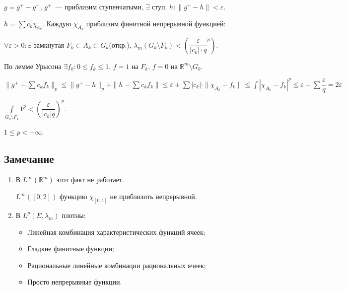 \documentclass{article}
\begin{document}
            $g = g^+ - g^-$, $g^+$~--- приблизим ступенчатыми, $\exists$ ступ. $h : \| g^+ - h \| < \varepsilon$.
            
            $h = \sum c_k \chi_{a_k}$. Каждую $\chi_{A_k}$ приблизим финитной непрерывной функцией:
            
            $\forall \varepsilon > 0 : \exists$ замкнутая $F_k \subset A_k \subset G_k$(откр.), $\lambda_m \left( G_k \setminus F_k \right) < \left(\dfrac{\varepsilon}{|c_k|\cdot q}^p \right)$.
            
            По лемме Урысона $\exists f_k : 0 \leqslant f_k \leqslant 1$, $f = 1$ на $F_k$, $f = 0$ на $\mathbb{R}^m \setminus G_k$.
            
            $\| g^+ - \sum c_k f_k \|_p \leqslant \| g^+ - h \|_p + \| h - \sum c_k f_k \| \leqslant \varepsilon + \sum |c_k| \cdot \| \chi_{A_k} - f_k \| \leqslant \int \left| \chi_{A_k} - f_k \right|^p \leqslant \varepsilon + \sum \dfrac{\varepsilon}{q} = 2 \varepsilon$
            
            $\int\limits_{G_k \setminus F_k} 1^p < \left( \dfrac{\varepsilon}{|c_k|q} \right)^p$.
            
            $1 \leqslant p < +\infty$.
            
        \subsection{Замечание}
        
            \begin{enumerate}
            
                \item В $L^{\infty} \left( \mathbb{R}^m \right)$ этот факт не работает.
                
                    $L^{\infty} \left( [0, 2] \right)$ функцию $\chi_{[0, 1]}$ не приблизить непрерывной.
                    
                \item В $L^p \left( E, \lambda_m \right)$ плотны:
                
                    \begin{itemize}
                    
                        \item Линейная комбинация характеристических функций ячеек;
                
                        \item Гладкие финитные функции;
                        
                        \item Рациональные линейные комбинации рациональных ячеек;
                        
                        \item Просто непрерывные функции.
                        
                    \end{itemize}
                    
            \end{enumerate}
            
\end{document}
